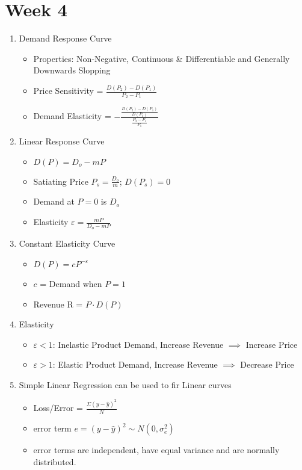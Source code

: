 \documentclass[a4paper]{article}
\begin{document}
\section{Week 4}
	\begin{enumerate}
		\item Demand Response Curve
		\begin{itemize}
			\item Properties: Non-Negative, Continuous \& Differentiable and Generally Downwards Slopping
			\item Price Sensitivity = $\frac{D(P_{2}) - D(P_{1})}{P_{2} - P_{1}}$
			\item Demand Elasticity = $-\frac{\frac{D(P_{2}) - D(P_{1})}{D(P_{1})}}{\frac{P_{2} - P_{1}}{P_{1}}}$\\
		\end{itemize}
		\item Linear Response Curve
		\begin{itemize}
			\item $D(P) = D_{o} - mP$
			\item Satiating Price $P_{s} = \frac{D_{o}}{m}$; $D(P_{s}) = 0$
			\item Demand at $P = 0$ is $D_{o}$
			\item Elasticity $\varepsilon = \frac{mP}{D_{o} - mP}$ 
		\end{itemize}
		\item Constant Elasticity Curve
		\begin{itemize}
			\item $D(P) = cP^{-\varepsilon}$
			\item $c$ = Demand when $P = 1$
			\item Revenue R = $P\cdot D(P)$
		\end{itemize}
		\item Elasticity
		\begin{itemize}
			\item $\varepsilon < 1$: Inelastic Product Demand, Increase Revenue $\implies$ Increase Price
			\item $\varepsilon > 1$: Elastic Product Demand, Increase Revenue $\implies$ Decrease Price
		\end{itemize}
		\item Simple Linear Regression can be used to fir Linear curves
		\begin{itemize}
			\item Loss/Error = $\frac{\Sigma (y - \hat{y})^{2}}{N}$
			\item error term $e = (y - \hat{y})^{2} \sim N(0,\sigma_{e}^{2})$
			\item error terms are independent, have equal variance and are normally distributed. 
		\end{itemize}
	\end{enumerate}
\end{document}
